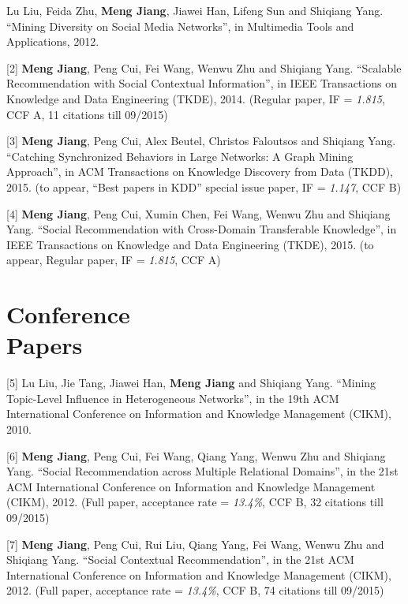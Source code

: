 \documentclass[margin, 10pt]{res} %
\begin{document}
\begin{resume}
[1] Lu Liu, Feida Zhu, {\bf Meng Jiang}, Jiawei Han, Lifeng Sun and Shiqiang Yang. ``Mining Diversity on Social Media Networks'', in Multimedia Tools and Applications, 2012.

[2] {\bf Meng Jiang}, Peng Cui, Fei Wang, Wenwu Zhu and Shiqiang Yang. ``Scalable Recommendation with Social Contextual Information'', in IEEE Transactions on Knowledge and Data Engineering (TKDE), 2014. (Regular paper, IF = {\em 1.815}, CCF A, 11 citations till 09/2015)

[3] {\bf Meng Jiang}, Peng Cui, Alex Beutel, Christos Faloutsos and Shiqiang Yang. ``Catching Synchronized Behaviors in Large Networks: A Graph Mining Approach'', in ACM Transactions on Knowledge Discovery from Data (TKDD), 2015. (to appear, ``Best papers in KDD'' special issue paper, IF = {\em 1.147}, CCF B)

[4] {\bf Meng Jiang}, Peng Cui, Xumin Chen, Fei Wang, Wenwu Zhu and Shiqiang Yang. ``Social Recommendation with Cross-Domain Transferable Knowledge'', in IEEE Transactions on Knowledge and Data Engineering (TKDE), 2015. (to appear, Regular paper, IF = {\em 1.815}, CCF A)


\section{Conference \\ Papers}

[5] Lu Liu, Jie Tang, Jiawei Han, {\bf Meng Jiang} and Shiqiang Yang. ``Mining Topic-Level Influence in Heterogeneous Networks'', in the 19th ACM International Conference on Information and Knowledge Management (CIKM), 2010.

[6] {\bf Meng Jiang}, Peng Cui, Fei Wang, Qiang Yang, Wenwu Zhu and Shiqiang Yang. ``Social Recommendation across Multiple Relational Domains'', in the 21st ACM International Conference on Information and Knowledge Management (CIKM), 2012. (Full paper, acceptance rate = {\em 13.4\%}, CCF B, 32 citations till 09/2015)

[7] {\bf Meng Jiang}, Peng Cui, Rui Liu, Qiang Yang, Fei Wang, Wenwu Zhu and Shiqiang Yang. ``Social Contextual Recommendation'', in the 21st ACM International Conference on Information and Knowledge Management (CIKM), 2012. (Full paper, acceptance rate = {\em 13.4\%}, CCF B, 74 citations till 09/2015)


\end{resume}
\end{document}
